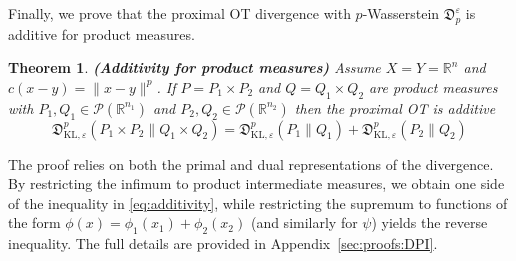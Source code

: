 \documentclass{amsart}
\newtheorem{theorem}{Theorem}[section]
\theoremstyle{definition}
\theoremstyle{remark}
\numberwithin{equation}{section}
\begin{document}
Finally, we prove that the proximal OT divergence with $p$-Wasserstein $\mathfrak{D}_{p}^\varepsilon$ is additive  for product measures.
\begin{theorem}{\bf (Additivity for product measures)}
\label{thm:additivity} Assume $X=Y=\mathbb{R}^n$ and $c(x-y)=\|x-y\|^p$.  If  $P= P_1 \times P_2$ and $Q=Q_1\times Q_2$  are product measures with $P_1, Q_1 \in \mathcal{P}(\mathbb{R}^{n_1})$ and $P_2, Q_2 \in \mathcal{P}(\mathbb{R}^{n_2})$ then the proximal OT is additive
  \begin{equation}\label{eq:additivity}
  \mathfrak{D}_{\mathrm{KL},\varepsilon}^{p}( P_1 \times P_2  \| Q_1\times Q_2)=   \mathfrak{D}_{\mathrm{KL},\varepsilon}^{p}( P_1  \| Q_1 ) + \mathfrak{D}_{\mathrm{KL},\varepsilon}^{p}( P_2  \| Q_2 )
\end{equation}
\end{theorem}  

The proof relies on both the primal and dual representations of the divergence. By restricting the infimum to product intermediate measures, we obtain one side of the inequality in \eqref{eq:additivity}, while restricting the supremum to functions of the form $\phi(x)=\phi_1(x_1) + \phi_2(x_2)$ (and similarly for $\psi$) yields the reverse inequality. The full details are provided in Appendix~\ref{sec:proofs:DPI}.
\end{document}

